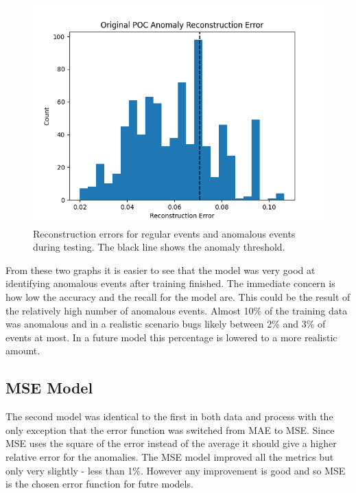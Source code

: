 \documentclass[a4paper,11pt]{article}
\begin{document}
\begin{figure}[H]
\centering
\includegraphics[width=.8\textwidth]{original_poc_anomaly_reconstruction.png}
\caption{Reconstruction errors for regular events and anomalous events during testing. The black line shows the anomaly threshold.}
\label{original_poc_anomaly}
\end{figure}
From these two graphs it is easier to see that the model was very good at identifying anomalous events after training finished. The immediate concern is  how low the accuracy and the recall for the model are. This could be the result of the relatively high number of anomalous events. Almost 10\% of the training data was anomalous and in a realistic scenario bugs likely between 2\% and 3\% of events at most. In a future model this percentage is lowered to a more realistic amount.
\subsection{MSE Model}
The second model was identical to the first in both data and process with the only exception that the error function was switched from MAE to MSE. Since MSE uses the square of the error instead of the average it should give a higher relative error for the anomalies. The MSE model improved all the metrics but only very slightly - less than 1\%. However any improvement is good and so MSE is the chosen error function for futre models.
\end{document}
